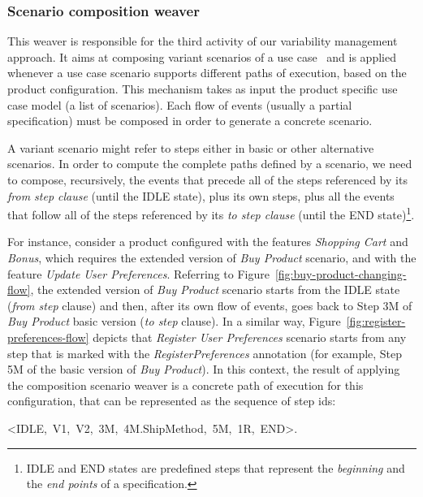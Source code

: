 \documentclass{acm_proc_article-sp}
\begin{document}

\subsubsection{Scenario composition weaver}\label{sub:sc-weaver}

This weaver is responsible for the third activity of our variability management 
approach. It aims at composing variant scenarios of a use case~\cite{gcabral-sbmf-2006} and 
is applied whenever a use case scenario supports different paths of execution, based on the product configuration.
This mechanism takes as input the product specific use case model (a list of scenarios). Each flow of events 
(usually a partial specification) must be composed in order to generate a concrete scenario.

A variant scenario 
might refer to steps either in basic or other alternative scenarios. In order
to compute the complete paths defined by a scenario, we need to compose,
recursively, the events that precede all of the steps referenced by its \emph{from step
clause} (until the IDLE state), plus its own steps, plus all the
events that follow all of the steps referenced by its \emph{to step clause} (until the END
state)\footnote{IDLE and END states are predefined steps that
represent the \emph{beginning} and the \emph{end points} of a
specification.}. 

For instance, consider a product configured with the features \emph{Shopping Cart} and \emph{Bonus}, which requires the extended version of \emph{Buy Product} scenario, and with the feature \emph{Update User Preferences}. Referring to Figure~\ref{fig:buy-product-changing-flow}, the extended version of 
\emph{Buy Product} scenario starts from the IDLE state (\emph{from step} clause) and then, after its own flow of events, goes back to Step 3M of \emph{Buy Product} basic version (\emph{to step} clause). In a similar way, Figure~\ref{fig:register-preferences-flow} depicts that \emph{Register User Preferences} scenario starts from any step that is marked with the \emph{RegisterPreferences} annotation (for example, Step 5M of the basic version of \emph{Buy Product}). In this context, the result of applying the composition scenario weaver is a concrete path of execution for this configuration, that can be represented as the sequence of step ids: 

\begin{center}
\mbox{<IDLE, V1, V2, 3M, 4M.ShipMethod, 5M, 1R, END>}.
\end{center}
\end{document}
